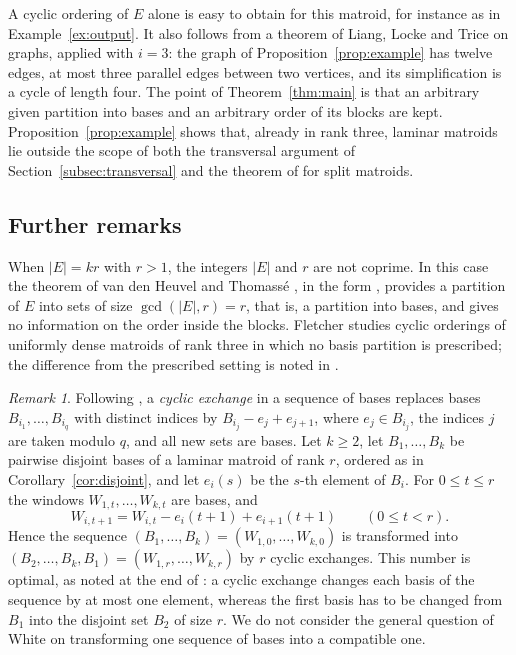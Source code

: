 \documentclass[11pt]{amsart}
\theoremstyle{definition}
\theoremstyle{remark}
\newtheorem{remark}[theorem]{Remark}
\numberwithin{equation}{section}
\begin{document}
A cyclic ordering of $E$ alone is easy to obtain for this matroid, for instance as in Example~\ref{ex:output}. It also follows from a theorem of Liang, Locke and Trice \cite[Theorem~3.2(i)]{LLT} on graphs, applied with $i=3$: the graph of Proposition~\ref{prop:example} has twelve edges, at most three parallel edges between two vertices, and its simplification is a cycle of length four. The point of Theorem~\ref{thm:main} is that an arbitrary given partition into bases and an arbitrary order of its blocks are kept. Proposition~\ref{prop:example} shows that, already in rank three, laminar matroids lie outside the scope of both the transversal argument of Section~\ref{subsec:transversal} and the theorem of \cite{BJM} for split matroids.

\subsection{Further remarks}
When $|E|=kr$ with $r>1$, the integers $|E|$ and $r$ are not coprime. In this case the theorem of van den Heuvel and Thomass\'e \cite{HT}, in the form \cite[Theorem~14]{BJM}, provides a partition of $E$ into sets of size $\gcd(|E|,r)=r$, that is, a partition into bases, and gives no information on the order inside the blocks. Fletcher \cite[Theorem~1.2 and Corollary~1.3]{Fletcher} studies cyclic orderings of uniformly dense matroids of rank three in which no basis partition is prescribed; the difference from the prescribed setting is noted in \cite[Remark~2.5]{Fletcher}.

\begin{remark}\label{rem:exchange}
Following \cite[Section~4.2]{BJM}, a \emph{cyclic exchange} in a sequence of bases replaces bases $B_{i_1},\dots,B_{i_q}$ with distinct indices by $B_{i_j}-e_j+e_{j+1}$, where $e_j\in B_{i_j}$, the indices $j$ are taken modulo $q$, and all new sets are bases. Let $k\ge2$, let $B_1,\dots,B_k$ be pairwise disjoint bases of a laminar matroid of rank $r$, ordered as in Corollary~\ref{cor:disjoint}, and let $e_i(s)$ be the $s$-th element of $B_i$. For $0\le t\le r$ the windows $W_{1,t},\dots,W_{k,t}$ are bases, and
\[
W_{i,t+1}=W_{i,t}-e_i(t+1)+e_{i+1}(t+1)\qquad(0\le t<r).
\]
Hence the sequence $(B_1,\dots,B_k)=(W_{1,0},\dots,W_{k,0})$ is transformed into $(B_2,\dots,B_k,B_1)=(W_{1,r},\dots,W_{k,r})$ by $r$ cyclic exchanges. This number is optimal, as noted at the end of \cite[Section~4.2]{BJM}: a cyclic exchange changes each basis of the sequence by at most one element, whereas the first basis has to be changed from $B_1$ into the disjoint set $B_2$ of size $r$. We do not consider the general question of White \cite{White} on transforming one sequence of bases into a compatible one.
\end{remark}
\end{document}
